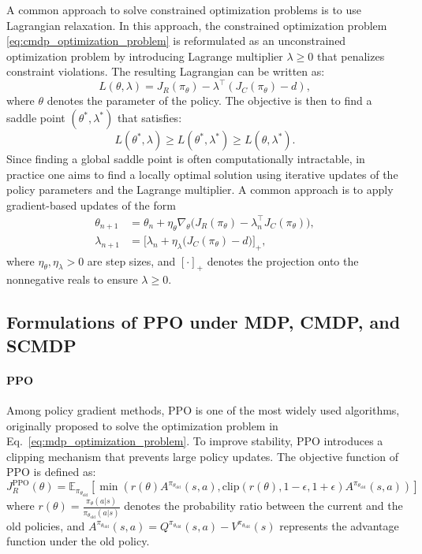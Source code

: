 A common approach to solve constrained optimization problems is to use Lagrangian relaxation.
In this approach, the constrained optimization problem \eqref{eq:cmdp_optimization_problem} is reformulated as an unconstrained optimization problem by introducing Lagrange multiplier $\lambda \geq 0$ that penalizes constraint violations.
The resulting Lagrangian can be written as:
\begin{equation}
    L(\theta, \lambda) = J_R(\pi_\theta) - \lambda^\top (J_C(\pi_\theta) - d),
\end{equation}
where $\theta$ denotes the parameter of the policy.
The objective is then to find a saddle point $(\theta^*, \lambda^*)$ that satisfies:
\begin{equation}
    L(\theta^*, \lambda) \geq L(\theta^*, \lambda^*) \geq L(\theta, \lambda^*).
\end{equation}
Since finding a global saddle point is often computationally intractable, in practice one aims to find a locally optimal solution using iterative updates of the policy parameters and the Lagrange multiplier. 
A common approach is to apply gradient-based updates of the form
\begin{align}
    \theta_{n+1} &= \theta_n + \eta_\theta \nabla_\theta \Big(J_R(\pi_\theta) - \lambda_n^\top J_C(\pi_\theta)\Big), \\
    \lambda_{n+1} &= \Big[ \lambda_n + \eta_\lambda \big( J_C(\pi_\theta) - d \big) \Big]_+,
\end{align}
where $\eta_\theta, \eta_\lambda > 0$ are step sizes, and $[\cdot]_+$ denotes the projection onto the nonnegative reals to ensure $\lambda \geq 0$.


\subsection{Formulations of PPO under MDP, CMDP, and SCMDP}

\paragraph{PPO}

Among policy gradient methods, PPO is one of the most widely used algorithms, originally proposed to solve the optimization problem in Eq.~\ref{eq:mdp_optimization_problem}.
To improve stability, PPO introduces a clipping mechanism that prevents large policy updates.
The objective function of PPO is defined as:
\begin{equation} \label{eq:ppo_objective}
    J^{\text{PPO}}_R(\theta) = \mathbb{E}_{\pi_{\theta_\text{old}}} \left[ \min \left( r(\theta) A^{\pi_{\theta_\text{old}}}(s, a), \text{clip}(r(\theta), 1 - \epsilon, 1 + \epsilon) A^{\pi_{\theta_\text{old}}}(s, a) \right) \right]
\end{equation}
where $r(\theta) = \frac{\pi_\theta(a|s)}{\pi_{\theta_\text{old}}(a|s)}$ denotes the probability ratio between the current and the old policies, and $A^{\pi_{\theta_\text{old}}}(s, a) = Q^{\pi_{\theta_\text{old}}}(s, a) - V^{\pi_{\theta_\text{old}}}(s)$ represents the advantage function under the old policy.

